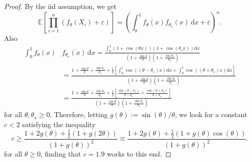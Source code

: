 \documentclass[11pt,twoside]{article}
\def\EE{\mathbb{E}}
\begin{document}
\begin{proof}
    By the iid assumption, we get
    \begin{equation*}
        \EE\left[\prod_{i=1}^n (f_\theta(X_i)+ \varepsilon)\right] = \left(\int_0^1 f_\theta(x)f_{\theta_\star}(x) \,\mathrm dx + \varepsilon\right)^n.
    \end{equation*}
    Also
    \begin{align*}
        \int_0^1 f_\theta(x)& f_{\theta_\star}(x) \, \mathrm dx = \frac{\int_0^1 (1+\cos(\theta x))(1+\cos(\theta_\star x))\mathrm dx}{\left(1 +\frac{\sin\theta}{\theta}\right)\left( 1 +\frac{\sin\theta_\star}{\theta_\star}\right)} \\
        & = \frac{1 +\frac{\sin\theta}{\theta} + \frac{\sin\theta_\star}{\theta_\star} + \frac{1}{2}\left[\int_0^1 \cos((\theta-\theta_\star) x)\mathrm dx + \int_0^1 \cos((\theta+\theta_\star) x)\mathrm dx\right]}{\left(1 +\frac{\sin\theta}{\theta}\right)\left( 1 +\frac{\sin\theta_\star}{\theta_\star}\right)} \\
        & = \frac{1 +\frac{\sin\theta}{\theta} + \frac{\sin\theta_\star}{\theta_\star} + \frac{1}{2}\left[\frac{\sin(\theta-\theta_\star)}{\theta-\theta_\star} + \frac{\sin(\theta+\theta_\star)}{\theta+\theta_\star}\right]}{\left(1 +\frac{\sin\theta}{\theta}\right)\left( 1 +\frac{\sin\theta_\star}{\theta_\star}\right)}
    \end{align*}
    for all $\theta, \theta_\star\geq 0$. Therefore, letting $g(\theta):=\sin(\theta)/\theta$, we look for a constant $c<2$ satisfying the inequality
    \begin{equation}
        c \geq \frac{1 + 2g(\theta) + \frac{1}{2}(1+g(2\theta))}{(1+g(\theta))^2} \equiv \frac{1 + 2g(\theta) + \frac{1}{2}(1+g(\theta)\cos(\theta))}{(1+g(\theta))^2}.
    \end{equation}
    for all $\theta\geq 0$, finding that $c=1.9$ works to this end.
\end{proof}
\end{document}
